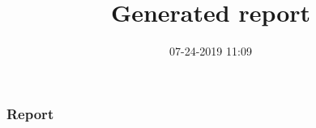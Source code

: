 \documentclass[slidestop]{beamer}
\numberwithin{equation}{section}
\begin{document}

\part{ }


\title[CIRL Generated Report]{Generated report}

\author{}

\institute{}

\date{07-24-2019 11:09}

\frame{\titlepage}

\section{Report}
\end{document}
